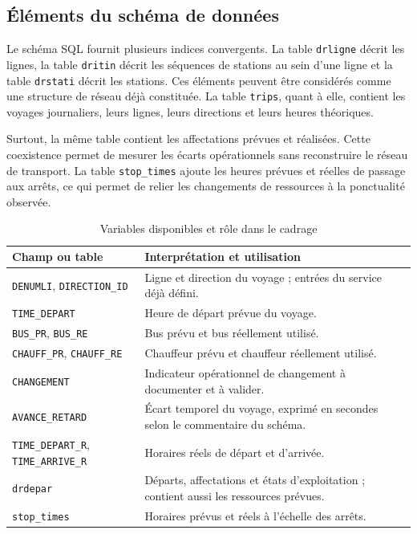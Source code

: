 \documentclass[12pt,a4paper]{article}
\newcommand{\code}[1]{\texttt{#1}}
\begin{document}
\subsection{Éléments du schéma de données}

Le schéma SQL fournit plusieurs indices convergents. La table \code{drligne} décrit les lignes, la table \code{dritin} décrit les séquences de stations au sein d’une ligne et la table \code{drstati} décrit les stations. Ces éléments peuvent être considérés comme une structure de réseau déjà constituée. La table \code{trips}, quant à elle, contient les voyages journaliers, leurs lignes, leurs directions et leurs heures théoriques.

Surtout, la même table contient les affectations prévues et réalisées. Cette coexistence permet de mesurer les écarts opérationnels sans reconstruire le réseau de transport. La table \code{stop\_times} ajoute les heures prévues et réelles de passage aux arrêts, ce qui permet de relier les changements de ressources à la ponctualité observée.

\begin{table}[ht]
\centering
\caption{Variables disponibles et rôle dans le cadrage}
\begin{tabularx}{\textwidth}{>{\ttfamily}p{3.2cm} X}
\toprule
Champ ou table & Interprétation et utilisation \\
\midrule
\code{DENUMLI}, \code{DIRECTION\_ID} & Ligne et direction du voyage ; entrées du service déjà défini. \\
\code{TIME\_DEPART} & Heure de départ prévue du voyage. \\
\code{BUS\_PR}, \code{BUS\_RE} & Bus prévu et bus réellement utilisé. \\
\code{CHAUFF\_PR}, \code{CHAUFF\_RE} & Chauffeur prévu et chauffeur réellement utilisé. \\
\code{CHANGEMENT} & Indicateur opérationnel de changement à documenter et à valider. \\
\code{AVANCE\_RETARD} & Écart temporel du voyage, exprimé en secondes selon le commentaire du schéma. \\
\code{TIME\_DEPART\_R}, \code{TIME\_ARRIVE\_R} & Horaires réels de départ et d’arrivée. \\
\code{drdepar} & Départs, affectations et états d’exploitation ; contient aussi les ressources prévues. \\
\code{stop\_times} & Horaires prévus et réels à l’échelle des arrêts. \\
\bottomrule
\end{tabularx}
\end{table}
\end{document}
